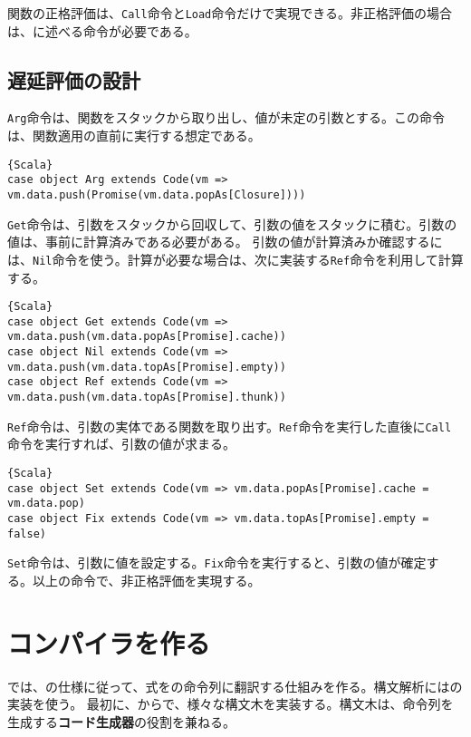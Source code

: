 \documentclass[10pt,a4paper]{book}
\begin{document}
関数の正格評価は、\texttt{Call}命令と\texttt{Load}命令だけで実現できる。非正格評価の場合は、に述べる命令が必要である。

\section{遅延評価の設計\label{sect:lazy}}

\texttt{Arg}命令は、関数をスタックから取り出し、値が未定の引数とする。この命令は、関数適用の直前に実行する想定である。

\begin{Verbatim}{Scala}
case object Arg extends Code(vm => vm.data.push(Promise(vm.data.popAs[Closure])))
\end{Verbatim}

\texttt{Get}命令は、引数をスタックから回収して、引数の値をスタックに積む。引数の値は、事前に計算済みである必要がある。
引数の値が計算済みか確認するには、\texttt{Nil}命令を使う。計算が必要な場合は、次に実装する\texttt{Ref}命令を利用して計算する。

\begin{Verbatim}{Scala}
case object Get extends Code(vm => vm.data.push(vm.data.popAs[Promise].cache))
case object Nil extends Code(vm => vm.data.push(vm.data.topAs[Promise].empty))
case object Ref extends Code(vm => vm.data.push(vm.data.topAs[Promise].thunk))
\end{Verbatim}

\texttt{Ref}命令は、引数の実体である関数を取り出す。\texttt{Ref}命令を実行した直後に\texttt{Call}命令を実行すれば、引数の値が求まる。

\begin{Verbatim}{Scala}
case object Set extends Code(vm => vm.data.popAs[Promise].cache = vm.data.pop)
case object Fix extends Code(vm => vm.data.topAs[Promise].empty = false)
\end{Verbatim}

\texttt{Set}命令は、引数に値を設定する。\texttt{Fix}命令を実行すると、引数の値が確定する。以上の命令で、非正格評価を実現する。

\chapter{コンパイラを作る\label{chap:favac}}

では、の仕様に従って、式をの命令列に翻訳する仕組みを作る。構文解析にはの実装を使う。
最初に、からで、様々な構文木を実装する。構文木は、命令列を生成する\textbf{コード生成器}の役割を兼ねる。
\end{document}
